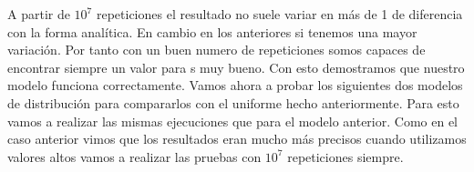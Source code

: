 \documentclass[]{article}
\begin{document}
\begin{enumerate}
\begin{table}[H]
\begin{center}
\begin{tabular}{|l|l|l|l|}
			\end{tabular}
			\label{tabla:sencilla}
		\end{center}
	\end{table}
	
\end{enumerate}

A partir de $10^{7}$ repeticiones el resultado no suele variar en más de 1 de diferencia con la forma analítica. En cambio en los anteriores si tenemos una mayor variación. Por tanto con un buen numero de repeticiones somos capaces de encontrar siempre un valor para s muy bueno. Con esto demostramos que nuestro modelo funciona correctamente.
\newline
\newline
Vamos ahora a probar los siguientes dos modelos de distribución para compararlos con el uniforme hecho anteriormente. Para esto vamos a realizar las mismas ejecuciones que para el modelo anterior. Como en el caso anterior vimos que los resultados eran mucho más precisos cuando utilizamos valores altos vamos a realizar las pruebas con $10^{7}$ repeticiones siempre.
\end{document}
